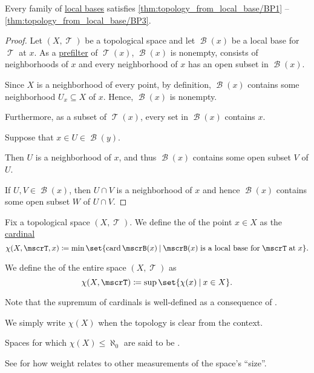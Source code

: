 \begin{proposition}\label{thm:local_base_can_generate_topology}
  Every family of \hyperref[def:topological_local_base]{local bases} satisfies \ref{thm:topology_from_local_base/BP1} -- \ref{thm:topology_from_local_base/BP3}.
\end{proposition}
\begin{proof}
  Let \( (X, \mscrT) \) be a topological space and let \( \mscrB(x) \) be a local base for \( \mscrT \) at \( x \). As a \hyperref[def:prefilter]{prefilter} of \( \mscrT(x) \), \( \mscrB(x) \) is nonempty, consists of neighborhoods of \( x \) and every neighborhood of \( x \) has an open subset in \( \mscrB(x) \).

   Since \( X \) is a neighborhood of every point, by definition, \( \mscrB(x) \) contains some neighborhood \( U_x \subseteq X \) of \( x \). Hence, \( \mscrB(x) \) is nonempty.

  Furthermore, as a subset of \( \mscrT(x) \), every set in \( \mscrB(x) \) contains \( x \).

   Suppose that \( x \in U \in \mscrB(y) \).

  Then \( U \) is a neighborhood of \( x \), and thus \( \mscrB(x) \) contains some open subset \( V \) of \( U \).

   If \( U, V \in \mscrB(x) \), then \( U \cap V \) is a neighborhood of \( x \) and hence \( \mscrB(x) \) contains some open subset \( W \) of \( U \cap V \).
\end{proof}

\begin{definition}\label{def:topological_space_character}
  Fix a topological space \( (X, \mscrT) \). We define the  of the point \( x \in X \) as the \hyperref[def:cardinal]{cardinal}
  \begin{equation*}
    \chi(X, \mscrT, x) \coloneqq \min \set{ \card \mscrB(x) \given \mscrB(x) \T{is a local base for} \mscrT \T{at} x }.
  \end{equation*}

  We define the  of the entire space \( (X, \mscrT) \) as
  \begin{equation*}
    \chi(X, \mscrT) \coloneqq \sup \set{ \chi(x) \given x \in X }.
  \end{equation*}

  Note that the supremum of cardinals is well-defined as a consequence of .

  We simply write \( \chi(X) \) when the topology is clear from the context.

  Spaces for which \( \chi(X) \leq \hyperref[def:aleph_hierarchy]{\aleph_0} \) are said to be .

  See  for how weight relates to other measurements of the space's \enquote{size}.
\end{definition}

